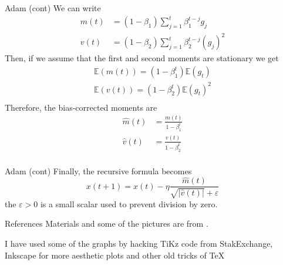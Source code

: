 \documentclass{beamer}
\begin{document}
\begin{frame}{Adam (cont)}
	We can write
	\begin{equation*}
	\begin{split}
		m(t)&= (1-\beta_1) \sum_{j=1}^t \beta_1^{t-j} g_j \\
		v(t)&=(1-\beta_2) \sum_{j=1}^t \beta_2^{t-j} (g_j)^2 
	\end{split}
\end{equation*} 		
Then, if we assume that the first and second moments are stationary  we get 
\begin{equation*}
	\begin{split}
	\mathbb{E}(m(t))=(1-\beta_1^t) \mathbb{E}(g_t) \\
		\mathbb{E}(v(t))=(1-\beta_2^t) \mathbb{E}(g_t)^2 \\
	\end{split}
\end{equation*}
Therefore, the bias-corrected moments are
\begin{equation*}
	\begin{split}
			\widehat{m}(t)&= \frac{m(t)}{1-\beta_1^t} \\
			\widehat{v}(t)&=\frac{v(t)}{1-\beta_2^t} \\
	\end{split}
\end{equation*}

\end{frame}
\begin{frame}{Adam (cont)}
	Finally, the recursive formula becomes
	\begin{equation*}
		x(t+1)= x(t)- \eta \frac{\widehat{m}(t)}{\sqrt{|\widehat{v}(t)|}+\varepsilon}
	\end{equation*}
	the $\varepsilon>0$ is a small scalar used to prevent division by zero. 
\end{frame}


\begin{frame}{References}
	Materials and some of the pictures are from \citep{calin}.
	\printbibliography 	
	
	I have used some of the graphs by hacking TiKz code from StakExchange, Inkscape for more aesthetic plots and other old tricks of \TeX
	
\end{frame}
\end{document}
